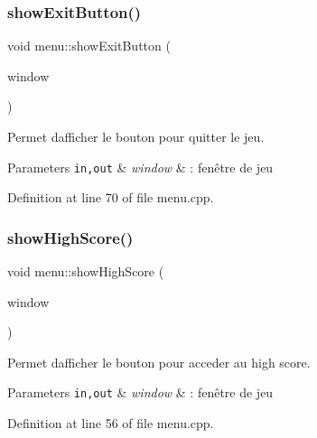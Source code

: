 \mbox{\label{namespacemenu_aeb814531cb10df0204e99514d4d8646a}} 
\subsubsection{\texorpdfstring{show\+Exit\+Button()}{showExitButton()}}
{\footnotesize\ttfamily void menu\+::show\+Exit\+Button (\begin{DoxyParamCaption}\item[{\hyperlink{class_min_g_l}{Min\+GL} \&}]{window }\end{DoxyParamCaption})}



Permet d\textquotesingle{}afficher le bouton pour quitter le jeu. 


\begin{DoxyParams}[1]{Parameters}
\mbox{\tt in,out}  & {\em window} & \+: fenêtre de jeu \\
\hline
\end{DoxyParams}


Definition at line 70 of file menu.\+cpp.

\mbox{\label{namespacemenu_a119e883604e235e4ab1756bfe3e8dfca}} 
\subsubsection{\texorpdfstring{show\+High\+Score()}{showHighScore()}}
{\footnotesize\ttfamily void menu\+::show\+High\+Score (\begin{DoxyParamCaption}\item[{\hyperlink{class_min_g_l}{Min\+GL} \&}]{window }\end{DoxyParamCaption})}



Permet d\textquotesingle{}afficher le bouton pour acceder au high score. 


\begin{DoxyParams}[1]{Parameters}
\mbox{\tt in,out}  & {\em window} & \+: fenêtre de jeu \\
\hline
\end{DoxyParams}


Definition at line 56 of file menu.\+cpp.

